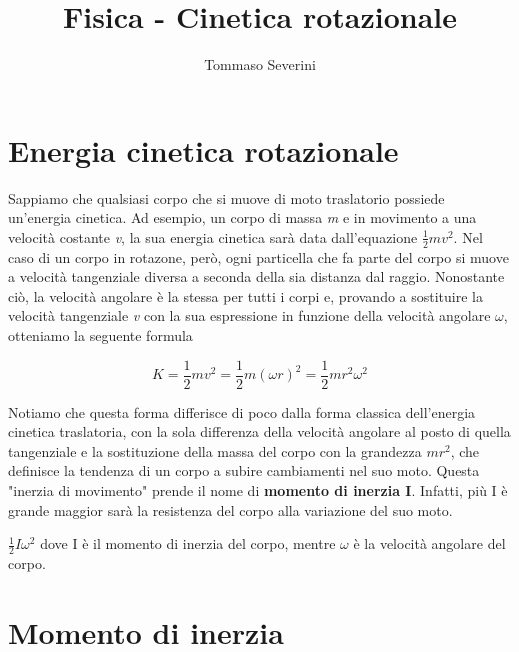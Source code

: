 \documentclass[10pt,a4paper]{article}
\author{Tommaso Severini}
\title{Fisica - Cinetica rotazionale}
\begin{document}
	\maketitle


	\section{Energia cinetica rotazionale}

	Sappiamo che qualsiasi corpo che si muove di moto traslatorio possiede un'energia cinetica. Ad esempio, un corpo di massa \textit{m} e in movimento a una velocità costante \textit{v}, la sua energia cinetica sarà data dall'equazione $\frac{1}{2}mv^2$.
	Nel caso di un corpo in rotazone, però, ogni particella che fa parte del corpo si muove a velocità tangenziale diversa a seconda della sia distanza dal raggio. Nonostante ciò, la velocità angolare è la stessa per tutti i corpi e, provando a sostituire la velocità tangenziale \textit{v} con la sua espressione in funzione della velocità angolare $\omega$, otteniamo la seguente formula

	\begin{equation}
		K = \frac{1}{2}mv^2 = \frac{1}{2}m (\omega r)^2 = \frac{1}{2}mr^2\omega^2
	\end{equation}

	Notiamo che questa forma differisce di poco dalla forma classica dell'energia cinetica traslatoria, con la sola differenza della velocità angolare al posto di quella tangenziale e la sostituzione della massa del corpo con la grandezza $mr^2$, che definisce la tendenza di un corpo a subire cambiamenti nel suo moto. Questa "inerzia di movimento" prende il nome di \textbf{momento di inerzia I}. Infatti, più I è grande maggior sarà la resistenza del corpo alla variazione del suo moto.

	\begin{definition}
		$\frac{1}{2}I \omega^2$ dove I è il momento di inerzia del corpo, mentre $\omega$ è la velocità angolare del corpo.
	\end{definition}

	\section{Momento di inerzia}
\end{document}
